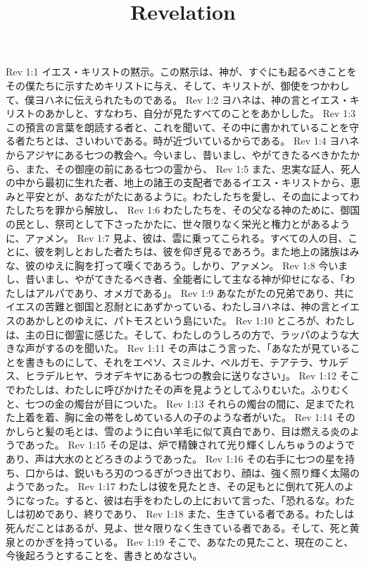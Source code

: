 

\title{Revelation}

Rev 1:1  イエス・キリストの黙示。この黙示は、神が、すぐにも起るべきことをその僕たちに示すためキリストに与え、そして、キリストが、御使をつかわして、僕ヨハネに伝えられたものである。
Rev 1:2  ヨハネは、神の言とイエス・キリストのあかしと、すなわち、自分が見たすべてのことをあかしした。
Rev 1:3  この預言の言葉を朗読する者と、これを聞いて、その中に書かれていることを守る者たちとは、さいわいである。時が近づいているからである。
Rev 1:4  ヨハネからアジヤにある七つの教会へ。今いまし、昔いまし、やがてきたるべきかたから、また、その御座の前にある七つの霊から、
Rev 1:5  また、忠実な証人、死人の中から最初に生れた者、地上の諸王の支配者であるイエス・キリストから、恵みと平安とが、あなたがたにあるように。わたしたちを愛し、その血によってわたしたちを罪から解放し、
Rev 1:6  わたしたちを、その父なる神のために、御国の民とし、祭司として下さったかたに、世々限りなく栄光と権力とがあるように、アァメン。
Rev 1:7  見よ、彼は、雲に乗ってこられる。すべての人の目、ことに、彼を刺しとおした者たちは、彼を仰ぎ見るであろう。また地上の諸族はみな、彼のゆえに胸を打って嘆くであろう。しかり、アァメン。
Rev 1:8  今いまし、昔いまし、やがてきたるべき者、全能者にして主なる神が仰せになる、「わたしはアルパであり、オメガである」。
Rev 1:9  あなたがたの兄弟であり、共にイエスの苦難と御国と忍耐とにあずかっている、わたしヨハネは、神の言とイエスのあかしとのゆえに、パトモスという島にいた。
Rev 1:10  ところが、わたしは、主の日に御霊に感じた。そして、わたしのうしろの方で、ラッパのような大きな声がするのを聞いた。
Rev 1:11  その声はこう言った、「あなたが見ていることを書きものにして、それをエペソ、スミルナ、ペルガモ、テアテラ、サルデス、ヒラデルヒヤ、ラオデキヤにある七つの教会に送りなさい」。
Rev 1:12  そこでわたしは、わたしに呼びかけたその声を見ようとしてふりむいた。ふりむくと、七つの金の燭台が目についた。
Rev 1:13  それらの燭台の間に、足までたれた上着を着、胸に金の帯をしめている人の子のような者がいた。
Rev 1:14  そのかしらと髪の毛とは、雪のように白い羊毛に似て真白であり、目は燃える炎のようであった。
Rev 1:15  その足は、炉で精錬されて光り輝くしんちゅうのようであり、声は大水のとどろきのようであった。
Rev 1:16  その右手に七つの星を持ち、口からは、鋭いもろ刃のつるぎがつき出ており、顔は、強く照り輝く太陽のようであった。
Rev 1:17  わたしは彼を見たとき、その足もとに倒れて死人のようになった。すると、彼は右手をわたしの上において言った、「恐れるな。わたしは初めであり、終りであり、
Rev 1:18  また、生きている者である。わたしは死んだことはあるが、見よ、世々限りなく生きている者である。そして、死と黄泉とのかぎを持っている。
Rev 1:19  そこで、あなたの見たこと、現在のこと、今後起ろうとすることを、書きとめなさい。
